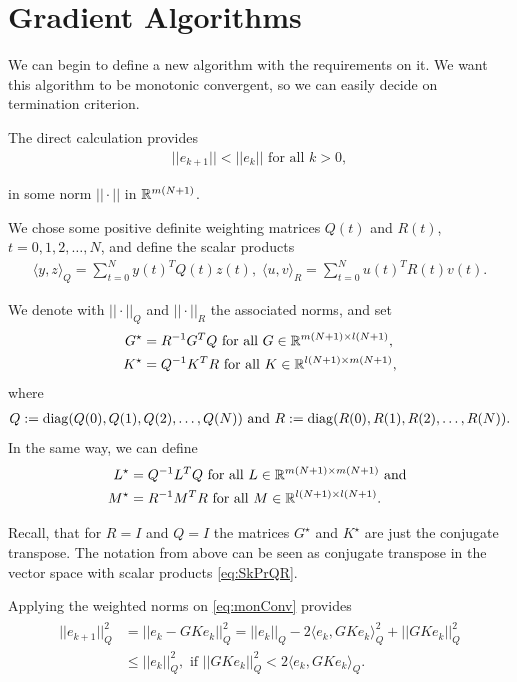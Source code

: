 	 \section{Gradient Algorithms}
We can begin to define a new algorithm with the requirements on it. We want this algorithm to be monotonic convergent, so we can easily decide on termination criterion. 

The direct calculation provides 
\begin{align}
\label{eq:monConv}
||e_{k+1}|| < ||e_k|| \text{ for all } k >0,
\end{align}

in some norm $|| \cdot || $ in ${\mathbb{R}}^{m(N+1)}$. 

We chose some positive definite weighting matrices $Q(t)$ and $R(t)$, $t = 0, 1, 2, \dots ,N$, and define the scalar products
\begin{align}
\label{eq:SkPrQR}
\langle y,z\rangle_Q = \sum_{t = 0}^N y(t)^TQ(t)z(t), \; \langle u,v\rangle_R = \sum_{t = 0}^N u(t)^T R(t) v(t).
\end{align}

We denote with $||\cdot||_Q$ and $||\cdot||_R$ the associated norms, and set
\begin{align*}
G^\star &= R^{-1} G^T Q \text{ for all } G \in {\mathbb{R}}^{m(N+1)\times l(N+1)},\\
K^\star &= Q^{-1} K^T R \text{ for all } K \in {\mathbb{R}}^{l(N+1)\times m(N+1)},
\end{align*}
where 
\begin{align}
Q := \operatorname*{diag}(Q(0), Q(1), Q(2) ,\dots, Q(N)) \text{ and } R:= \operatorname*{diag}(R(0), R(1), R(2), \dots, R(N)).
\end{align}
In the same way, we can define 
\begin{align}
L^\star &= Q^{-1} L^T Q \text{ for all } L \in {\mathbb{R}}^{m(N+1)\times m(N+1)} \text{ and }\\
M^\star &= R^{-1} M^T R \text{ for all } M \in {\mathbb{R}}^{l(N+1)\times l(N+1)}.
\end{align}

Recall, that for $R = I$ and $Q = I$ the matrices $G^\star$ and $K^\star$ are just the conjugate transpose. The notation from above can be seen as conjugate transpose in the vector space with scalar products \eqref{eq:SkPrQR}.

Applying the weighted norms on \eqref{eq:monConv} provides
\begin{align}
\begin{split}
||e_{k+1} ||_Q^2 &= ||e_k - G K e_k||_Q^2 = ||e_k||_Q - 2\langle e_k , G K e_k \rangle_Q^2 + ||G K e_k||_Q^2 \\ 
&\leq ||e_k||_Q^2, \text{ if } ||GK e_k||_Q^2 < 2 \langle e_k, GK e_k\rangle_Q. 
\end{split}
\end{align}

